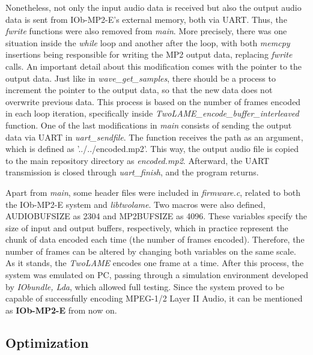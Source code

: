 Nonetheless, not only the input audio data is received but also the output audio data is sent from IOb-MP2-E's external memory, both via UART. Thus, the \textit{fwrite} functions were also removed from \textit{main}.
More precisely, there was one situation inside the \textit{while} loop and another after the loop, with both \textit{memcpy} insertions being responsible for writing the MP2 output data, replacing \textit{fwrite} calls. An important detail about this modification comes with the pointer to the output data. Just like in \textit{wave\_get\_samples}, there should be a process to increment the pointer to the output data, so that the new data does not overwrite previous data. This process is based on the number of frames encoded in each loop iteration, specifically inside \textit{\textit{TwoLAME}\_encode\_buffer\_interleaved} function.
One of the last modifications in \textit{main} consists of sending the output data via UART in \textit{uart\_sendfile}. The function receives the path as an argument, which is defined as ’../../encoded.mp2’. This way, the output audio file is copied to the main repository directory as \textit{encoded.mp2}.
Afterward, the UART transmission is closed through \textit{uart\_finish}, and the program returns.

Apart from \textit{main}, some header files were included in \textit{firmware.c}, related to both the IOb-MP2-E system and \textit{libtwolame}. Two macros were also defined, AUDIOBUFSIZE as 2304 and MP2BUFSIZE as 4096. These variables specify the size of input and output buffers, respectively, which in practice represent the chunk of data encoded each time (the number of frames encoded). Therefore, the number of frames can be altered by changing both variables on the same scale. As it stands, the \textit{TwoLAME} encodes one frame at a time. 
After this process, the system was emulated on PC, passing through a simulation environment developed by \textit{IObundle, Lda}, which allowed full testing. Since the system proved to be capable of successfully encoding MPEG-1/2 Layer II Audio, it can be mentioned as \textbf{IOb-MP2-E} from now on. 

\subsection{Optimization}

